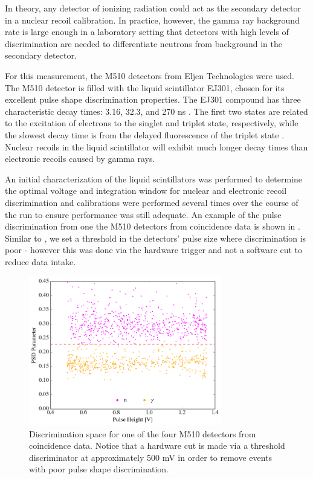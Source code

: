 In theory, any detector of ionizing radiation could act as the secondary detector in a nuclear recoil calibration.  In practice, however, the gamma ray background rate is large enough in a laboratory setting that detectors with high levels of discrimination are needed to differentiate neutrons from background in the secondary detector.  

For this measurement, the M510 detectors from Eljen Technologies were used.  The M510 detector is filled with the liquid scintillator EJ301, chosen for its excellent pulse shape discrimination properties.  The EJ301 compound has three characteristic decay times: 3.16, 32.3, and 270 ns \cite{kuchnir1968time, ej301_manual}.  The first two states are related to the excitation of electrons to the singlet and triplet state, respectively, while the slowest decay time is from the delayed fluorescence of the triplet state \cite{lang2017improved}.  Nuclear recoils in the liquid scintillator will exhibit much longer decay times than electronic recoils caused by gamma rays.  

An initial characterization of the liquid scintillators was performed to determine the optimal voltage and integration window for nuclear and electronic recoil discrimination and calibrations were performed several times over the course of the run to ensure performance was still adequate.  An example of the pulse discrimination from one the M510 detectors from coincidence data is shown in .  Similar to , we set a threshold in the detectors' pulse size where discrimination is poor - however this was done via the hardware trigger and not a software cut to reduce data intake. 

\begin{figure}[t]
        \centering
	\includegraphics[width=0.75\textwidth]{nerix_coin_ej}
	\caption{Discrimination space for one of the four M510 detectors from coincidence data.  Notice that a hardware cut is made via a threshold discriminator at approximately 500 mV in order to remove events with poor pulse shape discrimination.}
	\label{fig:nerix_ej_discrimination}
\end{figure}

